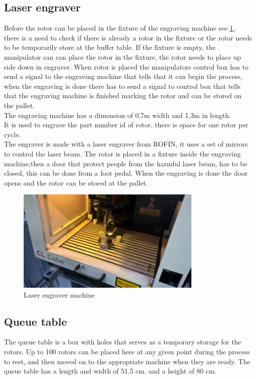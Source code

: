  \subsection{Laser engraver}
 Before the rotor can be placed in the fixture of the engraving machine see \ref{fig:Laserengravermachine}, there is a need to check if there is already a rotor in the fixture or the rotor needs to be temporarily store at the buffer table. If the fixture is empty, the manipulator can can place the rotor in the fixture, the rotor needs to place up side down in engraver. When rotor is placed the manipulators control box has to send a signal to the engraving machine that tells that it can begin the process, when the engraving is done there has to send a signal to control box that tells that the engraving machine is finished marking the rotor and can be stored on the pallet.\\ 
 
 The engraving machine has a dimension of 0,7m width and 1,3m in length.\\
 It is used to engrave the part number id of rotor, there is space for one rotor per cycle.\\
 The engraver is made with a laser engraver from ROFIN, it uses a set of mirrors to control the laser beam\cite{laser}. The rotor is placed in a fixture inside the engraving machine,then a door that protect people from the harmful laser beam, has to be closed, this can be done from a foot pedal. When the engraving is done the door opens and the rotor can be stored at the pallet.\\   
  
  \begin{figure}[h]
    \centering
    \includegraphics[width=9cm]{InitialProblemstatement/Case/engrave.PNG}
    \caption{Laser engraver machine\cite{Case}}
    \label{fig:Laserengravermachine}
  \end{figure}
  
 \subsection{Queue table}
 The queue table is a box with holes that serves as a temporary storage for the rotors. Up to 100 rotors can be placed here at any given point during the process to rest, and then moved on to the appropriate machine when they are ready. The queue table has a length and width of 51.5 cm. and a height of 80 cm.\\  \cite{}
 
